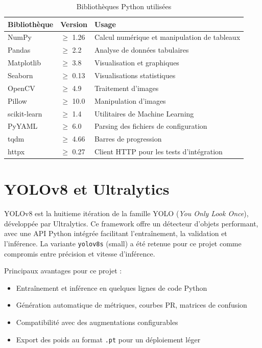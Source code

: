 \documentclass[a4paper,12pt]{report}
\begin{document}
\begin{table}[H]
\centering
\caption{Biblioth\`eques Python utilis\'ees}
\begin{tabularx}{\textwidth}{l l X}
\toprule
\textbf{Biblioth\`eque} & \textbf{Version} & \textbf{Usage} \\
\midrule
NumPy & $\geq$ 1.26 & Calcul num\'erique et manipulation de tableaux \\
Pandas & $\geq$ 2.2 & Analyse de donn\'ees tabulaires \\
Matplotlib & $\geq$ 3.8 & Visualisation et graphiques \\
Seaborn & $\geq$ 0.13 & Visualisations statistiques \\
OpenCV & $\geq$ 4.9 & Traitement d'images \\
Pillow & $\geq$ 10.0 & Manipulation d'images \\
scikit-learn & $\geq$ 1.4 & Utilitaires de Machine Learning \\
PyYAML & $\geq$ 6.0 & Parsing des fichiers de configuration \\
tqdm & $\geq$ 4.66 & Barres de progression \\
httpx & $\geq$ 0.27 & Client HTTP pour les tests d'int\'egration \\
\bottomrule
\end{tabularx}
\end{table}

\section{YOLOv8 et Ultralytics}
YOLOv8 est la huitieme it\'eration de la famille YOLO (\textit{You Only Look Once}), d\'evelopp\'ee par Ultralytics. Ce framework offre un d\'etecteur d'objets performant, avec une API Python int\'egr\'ee facilitant l'entra\^inement, la validation et l'inf\'erence. La variante \texttt{yolov8s} (small) a \'et\'e retenue pour ce projet comme compromis entre pr\'ecision et vitesse d'inf\'erence.

Principaux avantages pour ce projet :
\begin{itemize}
\item Entra\^inement et inf\'erence en quelques lignes de code Python
\item G\'en\'eration automatique de m\'etriques, courbes PR, matrices de confusion
\item Compatibilit\'e avec des augmentations configurables
\item Export des poids au format \texttt{.pt} pour un d\'eploiement l\'eger
\end{itemize}
\end{document}
